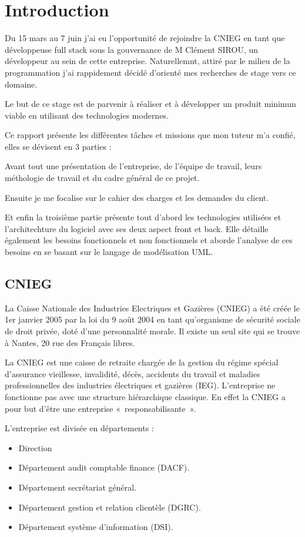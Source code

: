 \chapter*{Introduction}
Du 15 mars au 7 juin j’ai eu l'opportunité de rejoindre la CNIEG en tant que développeuse full stack sous 
la gouvernance de M Clément SIROU, un développeur au sein de cette entreprise. 
Naturellemnt, attiré par le milieu de  la programmation j'ai rappidement décidé d'orienté mes recherches 
de stage vers ce domaine.\medskip

Le but de ce stage est de parvenir à réaliser et à développer un produit minimun viable en utilisant 
des technologies modernes.\medskip

Ce rapport présente les différentes tâches et missions que mon tuteur m'a confié, elles se dévisent en 3 parties : 
\medskip

Avant tout une présentation de l'entreprise, de l'équipe de travail, leurs méthologie de travail et du cadre général de ce projet.\medskip

Ensuite je me focalise sur le cahier des charges et les demandes du client.\medskip

Et enfin la troisième partie présente tout d'abord les technologies utilisées et l'architechture du 
logiciel avec ses deux aspect front et back. Elle détaille également les besoins fonctionnels et non fonctionnels 
et aborde l'analyse de ces besoins en se basant sur le langage de modélisation UML. 

\medskip
   
    \section{CNIEG}
    La Caisse Nationale des Industries Electriques et Gazières (CNIEG) a été créée le 1er janvier 2005 par la loi du 9 août 2004 en tant qu’organisme de sécurité sociale de droit privée, doté d’une personnalité morale. Il existe un seul site qui se trouve à Nantes, 20 rue des Français libres.
	\medskip

    La CNIEG est une caisse de retraite chargée de la gestion du régime spécial d’assurance vieillesse, invalidité, décès, accidents du travail et maladies professionnelles des industries électriques et gazières (IEG).
	L’entreprise ne fonctionne pas avec une structure hiérarchique classique. En effet la CNIEG a pour but d’être une entreprise « responsabilisante ».
    \medskip

	L’entreprise est divisée en départements :
    \medskip
    \begin{itemize}[leftmargin=2cm]
        \item Direction
        \item Département audit comptable finance (DACF).
        \item Département secrétariat général.
        \item Département gestion et relation clientèle (DGRC).
        \item Département système d’information (DSI).
    \end{itemize}
	\medskip

